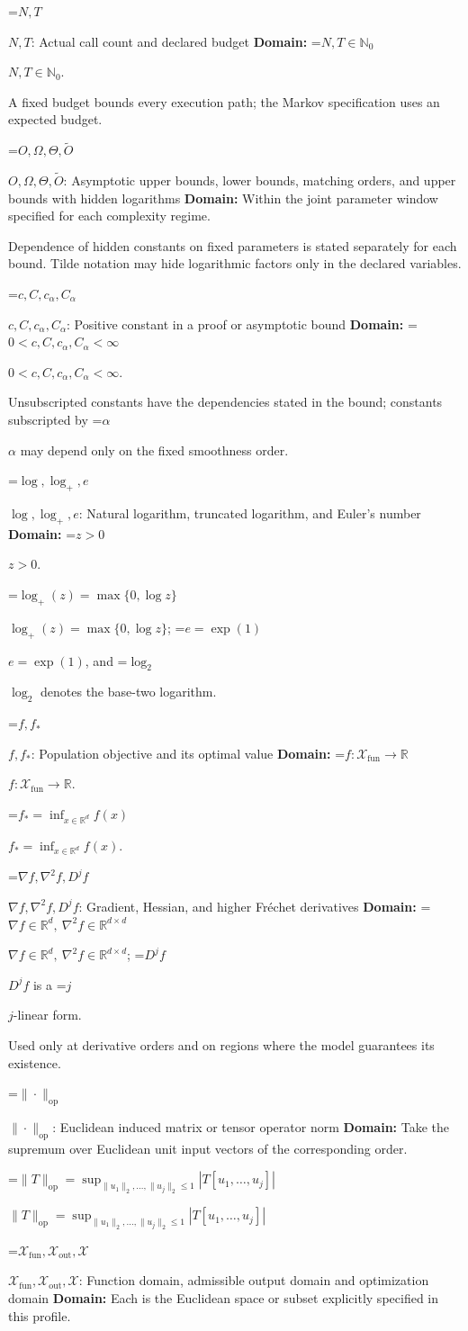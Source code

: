 \documentclass[10pt,a4paper]{article}
\newcommand{\AtlasMath}[1]{\par\begingroup\centering\setbox0=\hbox{$\displaystyle #1$}\ifdim\wd0>1.4\linewidth\typeout{ATLAS WIDE FORMULA: \the\wd0}\fi\ifdim\wd0>\linewidth\resizebox{\linewidth}{!}{\box0}\else\box0\fi\par\endgroup}
\newcommand{\AtlasInlineMath}[1]{\begingroup\setbox0=\hbox{$#1$}\ifdim\wd0>.4\linewidth\endgroup\AtlasMath{#1}\else\endgroup$#1$\fi}
\begin{document}
\AtlasInlineMath{N,T}: Actual call count and declared budget \textbf{Domain:} \AtlasInlineMath{N,T\in\mathbb{N}_0}.

A fixed budget bounds every execution path; the Markov specification uses an expected budget.

\AtlasInlineMath{O,\Omega,\Theta,\widetilde{O}}: Asymptotic upper bounds, lower bounds, matching orders, and upper bounds with hidden logarithms \textbf{Domain:} Within the joint parameter window specified for each complexity regime.

Dependence of hidden constants on fixed parameters is stated separately for each bound. Tilde notation may hide logarithmic factors only in the declared variables.

\AtlasInlineMath{c,C,c_\alpha,C_\alpha}: Positive constant in a proof or asymptotic bound \textbf{Domain:} \AtlasInlineMath{0<c,C,c_\alpha,C_\alpha<\infty}.

Unsubscripted constants have the dependencies stated in the bound; constants subscripted by \AtlasInlineMath{\alpha} may depend only on the fixed smoothness order.

\AtlasInlineMath{\log,\log_+,e}: Natural logarithm, truncated logarithm, and Euler's number \textbf{Domain:} \AtlasInlineMath{z>0}.

\AtlasInlineMath{\log_+(z)=\max\{0,\log z\}}; \AtlasInlineMath{e=\exp(1)}, and \AtlasInlineMath{\log_2} denotes the base-two logarithm.

\AtlasInlineMath{f,f_*}: Population objective and its optimal value \textbf{Domain:} \AtlasInlineMath{f:\mathcal{X}_{\mathrm{fun}}\to\mathbb{R}}.

\AtlasInlineMath{f_*=\inf_{x\in \mathbb{R}^d}f(x)}.

\AtlasInlineMath{\nabla f,\nabla^2f,D^jf}: Gradient, Hessian, and higher Fréchet derivatives \textbf{Domain:} \AtlasInlineMath{\nabla f\in\mathbb{R}^d,\ \nabla^2f\in\mathbb{R}^{d\times d}}; \AtlasInlineMath{D^jf} is a \AtlasInlineMath{j}-linear form.

Used only at derivative orders and on regions where the model guarantees its existence.

\AtlasInlineMath{\|\cdot\|_{\mathrm{op}}}: Euclidean induced matrix or tensor operator norm \textbf{Domain:} Take the supremum over Euclidean unit input vectors of the corresponding order.

\AtlasInlineMath{\|T\|_{\mathrm{op}}=\sup_{\|u_1\|_2,\ldots,\|u_j\|_2\le1}|T[u_1,\ldots,u_j]|}

\AtlasInlineMath{\mathcal{X}_{\mathrm{fun}},\mathcal{X}_{\mathrm{out}},\mathcal{X}}: Function domain, admissible output domain and optimization domain \textbf{Domain:} Each is the Euclidean space or subset explicitly specified in this profile.
\end{document}
